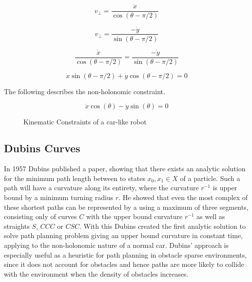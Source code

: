 \begin{equation}
v_\perp = \frac{\dot{x}}{\cos(\theta-\pi/2)}
\end{equation}

\begin{equation}
v_\perp = \frac{-\dot{y}}{\sin(\theta-\pi/2)}
\end{equation}

\begin{equation}
\frac{\dot{x}}{\cos(\theta-\pi/2)} = \frac{-\dot{y}}{\sin(\theta-\pi/2)}
\end{equation}

\begin{equation}
\dot{x}\sin(\theta-\pi/2) + \dot{y}\cos(\theta-\pi/2) = 0
\end{equation}

The following describes the non-holonomic constraint.

\begin{equation}
\dot{x}\cos(\theta) - \dot{y}\sin(\theta) = 0
\end{equation}

\begin{figure}[h]
    \caption{Kinematic Constraints of a car-like robot}
    \label{fig:kinematicConstraints}
\end{figure}

\subsection{Dubins Curves}
In 1957 Dubins published a paper, showing that there exists an analytic solution for the minimum path length between to states $x_0, x_1 \in X$ of a particle. Such a path will have a curvature along its entirety, where the curvature $r^{-1}$ is upper bound by a minimum turning radius $r$. He showed that even the most complex of these shortest paths can be represented by a using a maximum of three segments, consisting only of curves $C$ with the upper bound curvature $r^{-1}$ as well as straights $S$, $CCC$ or $CSC$. \cite{Dubins.1957} With this Dubins created the first analytic solution to solve path planning problem giving an upper bound curvature in constant time, applying to the non-holonomic nature of a normal car. Dubins' approach is especially useful as a heuristic for path planning in obstacle sparse environments, since it does not account for obstacles and hence paths are more likely to collide with the environment when the density of obstacles increases. 

